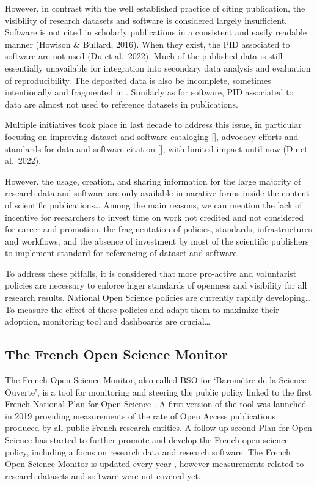 \documentclass[
]{article}
\begin{document}
However, in contrast with the well established practice of citing
publication, the visibility of research datasets and software is
considered largely insufficient. Software is not cited in scholarly
publications in a consistent and easily readable manner (Howison \&
Bullard, 2016). When they exist, the PID associated to software are not
used (Du et al.~2022). Much of the published data is still essentially
unavailable for integration into secondary data analysis and evaluation
of reproducibility. The deposited data is also be incomplete, sometimes
intentionally and fragmented in . Similarly as for software, PID
associated to data are almost not used to reference datasets in
publications.

Multiple initiatives took place in last decade to address this issue, in
particular focusing on improving dataset and software cataloging {[}{]},
advocacy efforts and standards for data and software citation {[}{]},
with limited impact until now (Du et al.~2022).

However, the usage, creation, and sharing information for the large
majority of research data and software are only available in narative
forms inside the content of scientific publications\ldots{} Among the
main reasons, we can mention the lack of incentive for researchers to
invest time on work not credited and not considered for career and
promotion, the fragmentation of policies, standards, infrastructures and
workflows, and the absence of investment by most of the scientific
publishers to implement standard for referencing of dataset and
software.

To address these pitfalls, it is considered that more pro-active and
voluntarist policies are necessary to enforce higer standards of
openness and visibility for all research results. National Open Science
policies are currently rapidly developing\ldots{} To measure the effect
of these policies and adapt them to maximize their adoption, monitoring
tool and dashboards are crucial\ldots{}

\hypertarget{the-french-open-science-monitor}{%
\subsection{The French Open Science
Monitor}\label{the-french-open-science-monitor}}

The French Open Science Monitor, also called BSO for `Baromètre de la
Science Ouverte', is a tool for monitoring and steering the public
policy linked to the first French National Plan for Open Science
\citep{mesri_national_2018}. A first version of the tool was launched in
2019 providing measurements of the rate of Open Access publications
produced by all public French research entities. A follow-up second Plan
for Open Science \citep{mesri_2nd_2021} has started to further promote
and develop the French open science policy, including a focus on
research data and research software. The French Open Science Monitor is
updated every year \citep{bracco_extending_2022}, however measurements
related to research datasets and software were not covered yet.
\end{document}
